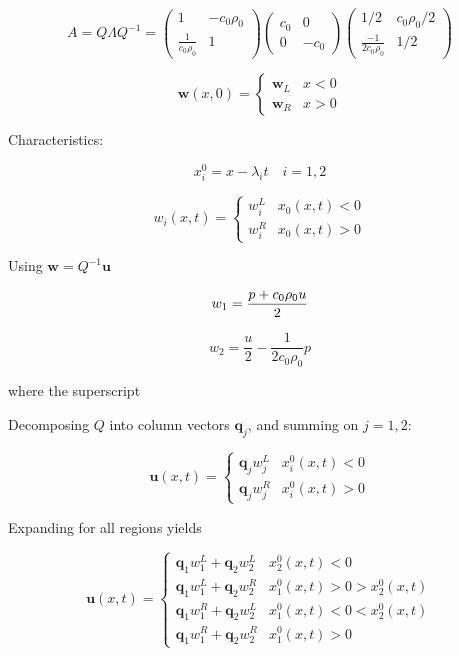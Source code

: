\documentclass[
  11pt,
]{article}
\begin{document}
\[
A = Q\Lambda Q^{-1} = 
\begin{pmatrix} 1 & -c_0 \rho_0 \\ \frac{1}{c_0 \rho_0} & 1 \end{pmatrix}
\begin{pmatrix}c_0 & 0 \\ 0 & -c_0\end{pmatrix}
\begin{pmatrix}1/2 & c_0 \rho_0 /2 \\ \frac{-1}{2 c_0 \rho_0 } & 1/2\end{pmatrix}
\]

\[
\mathbf{w}(x,0)=\left\{ \begin{array}{cc} \mathbf{w}_L & x<0 \\ \mathbf{w}_R & x>0 \end{array}\right.
\]

Characteristics:

\[
x_i^0 = x - \lambda_i t \quad i=1,2
\]

\[
w_i(x,t)=\left\{\begin{array}{cc} w_i^L & x_0(x,t)<0 \\ w_i^R & x_0(x,t)>0 \end{array}\right.
\]

Using \(\mathbf{w} = Q^{-1}\mathbf{u}\)

\[
w_1 = \frac{p + c_0 \rho_0 u}{2} \\
\]

\[
w_2 = \frac{u}{2} - \frac{1}{ 2 c_0 \rho_0 }p
\]

where the superscript

Decomposing \(Q\) into column vectors \(\mathbf{q}_j\), and summing on
\(j=1,2\):

\[
\mathbf{u}(x,t)= 
  \left\{\begin{array}{cc} 
   \mathbf{q}_jw_j^L & x^0_i(x,t)<0\\
   \mathbf{q}_jw_j^R & x^0_i(x,t)>0
  \end{array} \right.
\]

Expanding for all regions yields

\[
\mathbf{u}(x,t)= 
 \left\{\begin{array}{cc} 
  \mathbf{q}_1w_1^L + \mathbf{q}_2w_2^L& x^0_2(x,t)<0\\
  \mathbf{q}_1w_1^L + \mathbf{q}_2w_2^R& x^0_1(x,t)> 0 > x^0_2(x,t)\\
  \mathbf{q}_1w_1^R + \mathbf{q}_2w_2^L& x^0_1(x,t)< 0 < x^0_2(x,t)\\
  \mathbf{q}_1w_1^R + \mathbf{q}_2w_2^R& x^0_1(x,t)>0
 \end{array} \right.
\]
\end{document}
